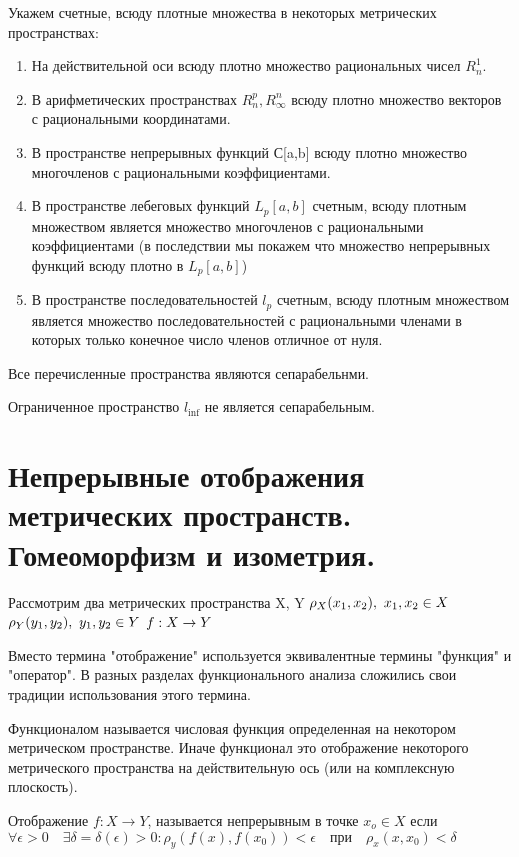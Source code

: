 \documentclass[12pt]{report}
\renewcommand{\[}{$\\\displaystyle}
\renewcommand{\]}{\\$}
\renewcommand{\[}{$\\\displaystyle}
\newcommand{\sep}{,\ }
\begin{document}
Укажем счетные, всюду плотные множества в некоторых метрических пространствах:

\begin{enumerate}
  \item На действительной оси всюду плотно множество рациональных чисел $R_n^1$.

  \item В арифметических пространствах $R_n^p, R_\infty^n$ всюду плотно
  множество векторов с рациональными координатами.

  \item В пространстве непрерывных функций С[a,b] всюду плотно множество
  многочленов с рациональными коэффициентами.

  \item В пространстве лебеговых функций $L_p[a,b]$ счетным, всюду плотным
  множеством является множество многочленов с рациональными коэффициентами (в
  последствии мы покажем что множество непрерывных функций всюду плотно в
  $L_p[a,b]$)

  \item В пространстве последовательностей $l_p$ счетным, всюду плотным
  множеством является множество последовательностей с рациональными членами в
  которых только конечное число членов отличное от нуля.
\end{enumerate}

Все перечисленные пространства являются сепарабельнми.

Ограниченное пространство $l_{\inf}$ не является сепарабельным.

\section{Непрерывные отображения метрических пространств.
Гомеоморфизм и изометрия.}

Рассмотрим два метрических пространства X, Y
\[\rho_X(x_1,x_2)\sep x_1,x_2\in X \]
\[\rho_Y(y_1, y_2)\sep y_1,y_2\in Y \]
\[ f: X \rightarrow Y\]

Вместо термина "отображение" используется эквивалентные термины "функция" и
"оператор". В разных разделах функционального анализа сложились свои традиции
использования этого термина.

Функционалом называется числовая функция определенная на некотором метрическом
пространстве. Иначе функционал это отображение некоторого метрического
пространства на действительную ось (или на комплексную плоскость).

Отображение $f: X\rightarrow Y$, называется непрерывным в точке $x_o\in X$ если
$ \forall \epsilon > 0 \quad \exists \delta = \delta (\epsilon) > 0:
\rho_y(f(x), f(x_0)) < \epsilon \quad \text{при} \quad \rho_x(x,x_0)<\delta $
\end{document}
